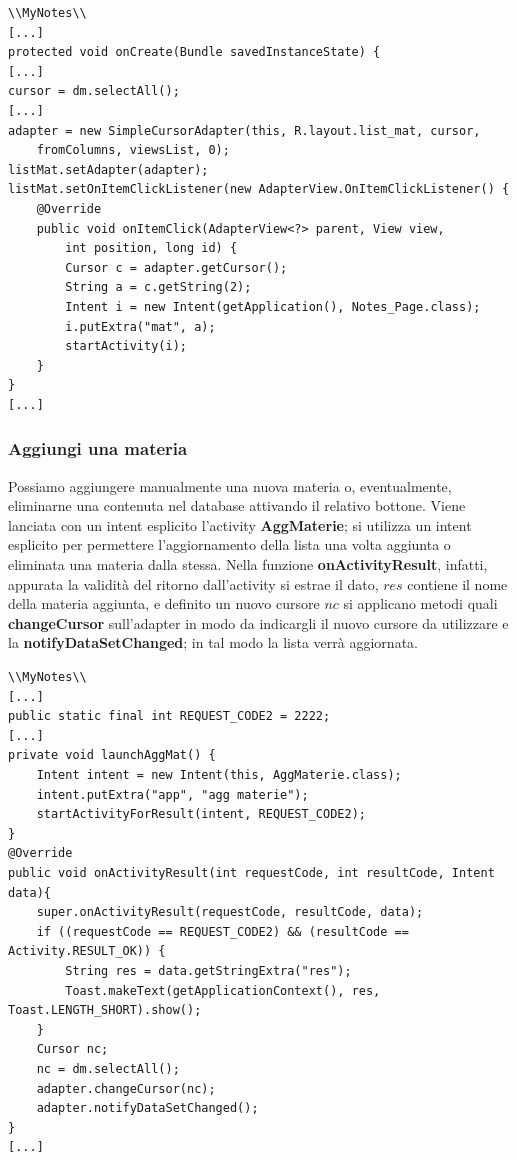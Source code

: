 \documentclass[a4paper, 50pt, twoside]{article}
\begin{document}
\begin{lstlisting}
\\MyNotes\\
[...]
protected void onCreate(Bundle savedInstanceState) {
[...]
cursor = dm.selectAll();
[...]
adapter = new SimpleCursorAdapter(this, R.layout.list_mat, cursor, 
	fromColumns, viewsList, 0);
listMat.setAdapter(adapter);
listMat.setOnItemClickListener(new AdapterView.OnItemClickListener() {
	@Override
	public void onItemClick(AdapterView<?> parent, View view, 
		int position, long id) {
		Cursor c = adapter.getCursor();
		String a = c.getString(2);
		Intent i = new Intent(getApplication(), Notes_Page.class);
		i.putExtra("mat", a);
		startActivity(i);
	}
}
[...]
\end{lstlisting}

\subsubsection{Aggiungi una materia}
Possiamo aggiungere manualmente una nuova materia o, eventualmente, eliminarne una contenuta nel database attivando il relativo bottone. Viene lanciata con un intent esplicito l'activity \textbf{AggMaterie}; si utilizza un intent esplicito per permettere l'aggiornamento della lista una volta aggiunta o eliminata una materia dalla stessa. Nella funzione \textbf{onActivityResult}, infatti, appurata la validità del ritorno dall'activity si estrae il dato, $res$ contiene il nome della materia aggiunta, e definito un nuovo cursore $nc$ si applicano metodi quali \textbf{changeCursor} sull'adapter in modo da indicargli il nuovo cursore da utilizzare e la \textbf{notifyDataSetChanged}; in tal modo la lista verrà aggiornata.

\begin{lstlisting}
\\MyNotes\\
[...]
public static final int REQUEST_CODE2 = 2222;
[...]
private void launchAggMat() {
	Intent intent = new Intent(this, AggMaterie.class);
	intent.putExtra("app", "agg materie");
	startActivityForResult(intent, REQUEST_CODE2);
}
@Override
public void onActivityResult(int requestCode, int resultCode, Intent data){
	super.onActivityResult(requestCode, resultCode, data);
	if ((requestCode == REQUEST_CODE2) && (resultCode == Activity.RESULT_OK)) {
		String res = data.getStringExtra("res");
		Toast.makeText(getApplicationContext(), res, Toast.LENGTH_SHORT).show();
	}
	Cursor nc;
	nc = dm.selectAll();
	adapter.changeCursor(nc);
	adapter.notifyDataSetChanged();
}
[...]
\end{lstlisting}
\end{document}
